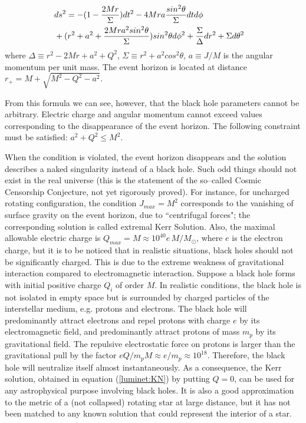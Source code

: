\documentclass{lamuphys}
\begin{document}
\begin{eqnarray}
        \lefteqn{ds^2  = - (1- \frac{2Mr}{\Sigma})dt^2 
        - 4Mra \frac{sin^2\theta}{\Sigma}dtd\phi}\nonumber\\
 & + (r^2 + a^2 + \frac{2Mr a^2 sin^2\theta}{\Sigma})sin^2\theta d\phi^2 + \frac{
\Sigma}{\Delta}dr^2 + \Sigma d\theta^2  \label{luminet:KN}
\end{eqnarray}
where
$\Delta \equiv r^2 - 2 Mr + a^2 + Q^2$, $ \Sigma \equiv r^2 + a^2 cos^2\theta$, 
$a \equiv J/M$ is the angular momentum per unit mass.
The event horizon is located at distance $r_+ = M + \sqrt{M^2 - Q^2 - a^2}$.
 
From this formula we can see, however, that the black hole parameters cannot
be arbitrary.
Electric charge and angular momentum cannot exceed values corresponding to
the disappearance of the event horizon.
The following constraint must be satisfied: $ a^2 + Q^2 \le M^2.$

When the condition is violated, the event horizon disappears and
the solution describes a naked singularity instead of a black hole. Such odd
things should not exist in the real universe (this is the statement of the so--called
Cosmic Censorship Conjecture, not yet rigorously proved). For instance, for uncharged rotating
configuration, the condition $J_{max} = M^2$ corresponds to the vanishing of surface gravity
on the event horizon, due to ``centrifugal forces"; the corresponding solution is called extremal Kerr Solution.
Also, the maximal allowable electric charge is 
$Q_{max} = M \approx 10^{40} e \, M/M_{\odot}$, where $e$ is the electron charge, but it is to be noticed that
in realistic situations, black holes should not be significantly charged. This is due to the
extreme weakness of gravitational interaction compared to electromagnetic interaction.
Suppose  a black hole forms with initial positive charge $Q_i$ of order $M$. In realistic
conditions, the black hole is not isolated in empty space but is surrounded by charged
particles of the interstellar medium, e.g. protons and electrons. The black hole will
predominantly  attract electrons and repel protons with charge $e$ by its electromagnetic
field, and predominantly attract protons of mass $m_p$ by its gravitational field.
The repulsive electrostatic force on protons is larger than the
gravitational pull by the factor
$eQ/m_pM \approx e/m_p \approx 10^{18}$.
Therefore, the black hole will neutralize itself almost instantaneously. As
a consequence, the Kerr solution, obtained in equation (\ref{luminet:KN}) by putting $Q=0$, can be
used for any astrophysical purpose involving black holes. It is also a good approximation to
the metric of a (not collapsed) rotating star at large distance, but it has not been matched
to any known solution that could represent the interior of a star.
\end{document}
